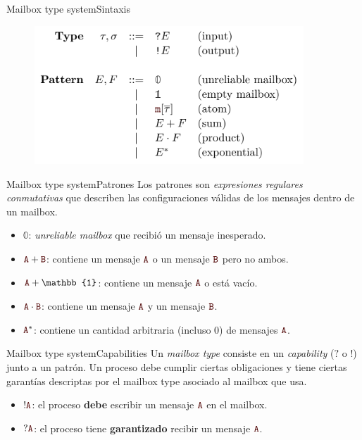 \documentclass{beamer}
\newcommand{\msgtag}[1]{\texttt{\textcolor{msg-color}{#1}}}
\begin{document}
\begin{frame}{Mailbox type system}{Sintaxis}
    \begin{figure}[H]
        \includegraphics[width=0.9\textwidth]{type-syntax}
    \end{figure}
\end{frame}

\begin{frame}{Mailbox type system}{Patrones}
    Los patrones son \emph{expresiones regulares conmutativas} que describen las configuraciones válidas de los mensajes dentro de un mailbox.
    \vspace{1em}
    \begin{itemize}
        \item $\mathbb{0}$: \emph{unreliable mailbox} que recibió un mensaje inesperado.
        \item $\msgtag{A} + \msgtag{B}$: contiene un mensaje $\msgtag{A}$ o un mensaje $\msgtag{B}$ pero no ambos.
        \item $\msgtag{A} + \mathbb{1}$: contiene un mensaje $\msgtag{A}$ o está vacío.
        \item $\msgtag{A} \cdot \msgtag{B}$: contiene un mensaje $\msgtag{A}$ y un mensaje $\msgtag{B}$.
        \item $\msgtag{A}^\ast$: contiene un cantidad arbitraria (incluso $0$) de mensajes $\msgtag{A}$.
    \end{itemize}
\end{frame}

\begin{frame}{Mailbox type system}{Capabilities}
    Un \emph{mailbox type} consiste en un \emph{capability} ($?$ o $!$) junto a un patrón. Un proceso debe cumplir ciertas obligaciones y tiene ciertas garantías descriptas por el mailbox type asociado al mailbox que usa.
    \vspace{1em}
    \begin{itemize}
        \item $!\msgtag{A}$: el proceso \textbf{debe} escribir un mensaje $\msgtag{A}$ en el mailbox.
        \item $?\msgtag{A}$: el proceso tiene \textbf{garantizado} recibir un mensaje $\msgtag{A}$.
    \end{itemize}
\end{frame}
\end{document}
